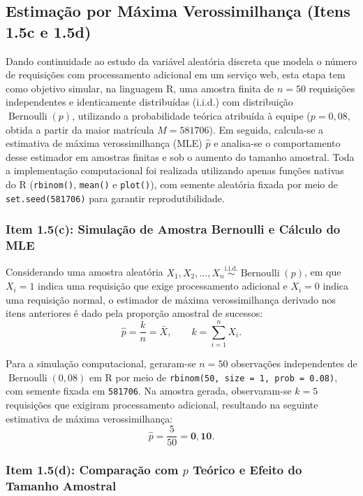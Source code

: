 \documentclass[12pt,a4paper]{article}
\begin{document}
\setcounter{section}{1}
\setcounter{subsection}{4}

\subsection{Estimação por Máxima Verossimilhança (Itens 1.5c e 1.5d)}

Dando continuidade ao estudo da variável aleatória discreta que modela o número de requisições com processamento adicional em um serviço web, esta etapa tem como objetivo simular, na linguagem R, uma amostra finita de $n = 50$ requisições independentes e identicamente distribuídas (i.i.d.) com distribuição $\operatorname{Bernoulli}(p)$, utilizando a probabilidade teórica atribuída à equipe ($p = 0{,}08$, obtida a partir da maior matrícula $M = 581706$). Em seguida, calcula-se a estimativa de máxima verossimilhança (MLE) $\hat{p}$ e analisa-se o comportamento desse estimador em amostras finitas e sob o aumento do tamanho amostral. Toda a implementação computacional foi realizada utilizando apenas funções nativas do R (\texttt{rbinom()}, \texttt{mean()} e \texttt{plot()}), com semente aleatória fixada por meio de \texttt{set.seed(581706)} para garantir reprodutibilidade.

\subsubsection{Item 1.5(c): Simulação de Amostra Bernoulli e Cálculo do MLE}

Considerando uma amostra aleatória $X_1, X_2, \dots, X_n \stackrel{\text{i.i.d.}}{\sim} \operatorname{Bernoulli}(p)$, em que $X_i = 1$ indica uma requisição que exige processamento adicional e $X_i = 0$ indica uma requisição normal, o estimador de máxima verossimilhança derivado nos itens anteriores é dado pela proporção amostral de sucessos:
\[
\hat{p} = \frac{k}{n} = \bar{X}, \qquad k = \sum_{i=1}^{n} X_i.
\]

Para a simulação computacional, geraram-se $n = 50$ observações independentes de $\operatorname{Bernoulli}(0{,}08)$ em R por meio de \texttt{rbinom(50, size = 1, prob = 0.08)}, com semente fixada em \texttt{581706}. Na amostra gerada, observaram-se $k = 5$ requisições que exigiram processamento adicional, resultando na seguinte estimativa de máxima verossimilhança:
\[
\hat{p} = \frac{5}{50} = \mathbf{0{,}10}.
\]

\subsubsection{Item 1.5(d): Comparação com $p$ Teórico e Efeito do Tamanho Amostral}
\end{document}

